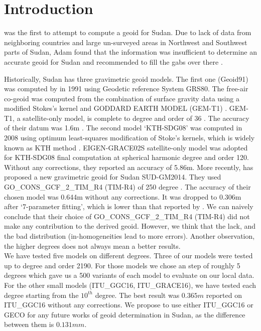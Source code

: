 \chapter{Introduction}
\label{Chapter1}
\cite{osman} was the first to attempt to compute a geoid for Sudan. Due to lack of data from neighboring countries and large un-surveyed areas in Northwest and Southwest parts of Sudan, Adam found that the information was insufficient to determine an accurate geoid for Sudan and recommended to fill the gabs over there \cite{ahmed_msc}. 

Historically, Sudan has three gravimetric geoid models. The first one (Geoid91) was computed by \cite{fashir} in 1991 using Geodetic reference System GRS80. The free-air co-geoid was computed from the combination of surface gravity data using a modified Stokes's kernel and GODDARD EARTH MODEL (GEM-T1)  \cite{fashir}. GEM-T1, a satellite-only model, is complete to degree and order of 36 \cite{nasa}. The accuracy of their datum was 1.6m \cite{fashir, godah}. The second model `KTH-SDG08' was computed in 2008 using optimum least-squares modification of Stoke's kernels, which is widely known as KTH method \cite{ahmed_msc}. EIGEN-GRACE02S satellite-only model was adopted for KTH-SDG08 final computation at spherical harmonic degree and order 120. Without any corrections, they reported an accuracy of 5.86m.
More recently, \citep{godah} has proposed a new gravimetric geoid for Sudan SUD-GM2014. They used GO\_CONS\_GCF\_2\_TIM\_R4 (TIM-R4) of 250 degree \cite{pail}. The accuracy of their chosen model was 0.644m without any corrections. It was dropped to 0.306m after `7-parameter fitting', which is lower than that reported by \citep{ahmed_msc}. We can naively conclude that their choice of GO\_CONS\_GCF\_2\_TIM\_R4 (TIM-R4) did not make any contribution to the derived geoid. However, we think that the lack, and the bad distribution (in-homogeneities lead to more errors). Another observation, the higher degrees does not always mean a better results.
\\
We have tested five models on different degrees. Three of our models were tested up to degree and order 2190. For those models we chose an step of roughly 5 degrees which gave us a 500 variants of each model to evaluate on our local data. For the other small models (ITU\_GGC16, ITU\_GRACE16), we have tested each degree starting from the $10^{th}$ degree. The best result was $0.365m$ reported on ITU\_GGC16 without any corrections. We propose to use either ITU\_GGC16 or GECO for any future works of geoid determination in Sudan, as the difference between them is $0.131mm$.

